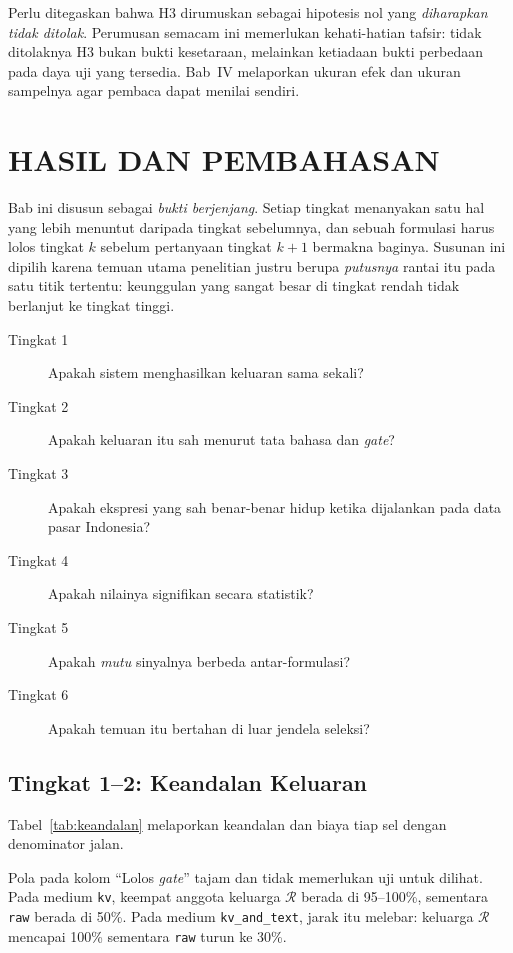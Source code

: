\documentclass{laporanta1statugm}
\newcommand{\code}[1]{\texttt{#1}}
\begin{document}
Perlu ditegaskan bahwa H3 dirumuskan sebagai hipotesis nol yang
\emph{diharapkan tidak ditolak}. Perumusan semacam ini memerlukan kehati-hatian
tafsir: tidak ditolaknya H3 bukan bukti kesetaraan, melainkan ketiadaan bukti
perbedaan pada daya uji yang tersedia. Bab~IV melaporkan ukuran efek dan
ukuran sampelnya agar pembaca dapat menilai sendiri.

\chapter{HASIL DAN PEMBAHASAN}

Bab ini disusun sebagai \emph{bukti berjenjang}. Setiap tingkat menanyakan satu
hal yang lebih menuntut daripada tingkat sebelumnya, dan sebuah formulasi harus
lolos tingkat $k$ sebelum pertanyaan tingkat $k+1$ bermakna baginya. Susunan
ini dipilih karena temuan utama penelitian justru berupa \emph{putusnya} rantai
itu pada satu titik tertentu: keunggulan yang sangat besar di tingkat rendah
tidak berlanjut ke tingkat tinggi.

\begin{description}
  \item[Tingkat 1] Apakah sistem menghasilkan keluaran sama sekali?
  \item[Tingkat 2] Apakah keluaran itu sah menurut tata bahasa dan
        \textit{gate}?
  \item[Tingkat 3] Apakah ekspresi yang sah benar-benar hidup ketika
        dijalankan pada data pasar Indonesia?
  \item[Tingkat 4] Apakah nilainya signifikan secara statistik?
  \item[Tingkat 5] Apakah \emph{mutu} sinyalnya berbeda antar-formulasi?
  \item[Tingkat 6] Apakah temuan itu bertahan di luar jendela seleksi?
\end{description}

\section{Tingkat 1--2: Keandalan Keluaran}

Tabel~\ref{tab:keandalan} melaporkan keandalan dan biaya tiap sel dengan
denominator jalan.



Pola pada kolom ``Lolos \textit{gate}'' tajam dan tidak memerlukan uji untuk
dilihat. Pada medium \code{kv}, keempat anggota keluarga $\mathcal{R}$ berada di
95--100\%, sementara \code{raw} berada di 50\%. Pada medium
\code{kv\_and\_text}, jarak itu melebar: keluarga $\mathcal{R}$ mencapai 100\%
sementara \code{raw} turun ke 30\%.
\end{document}
